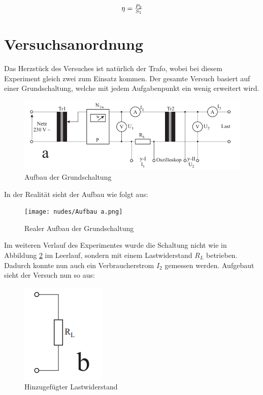 \documentclass[12pt,a4paper,twoside]{article}
\begin{document}
\begin{equation}
    \label{eq:Wirkungsgrad}
    \centerline{$\eta = \frac{P_{2}}{S_{1}}$}
\end{equation}


\section{Versuchsanordnung} %

Das Herzstück des Versuches ist natürlich der Trafo, wobei bei diesem Experiment gleich zwei zum Einsatz kommen. Der gesamte Versuch basiert auf einer Grundschaltung, welche mit jedem Aufgabenpunkt ein wenig erweitert wird.

    \begin{figure}[H]
        \centering
        \includegraphics[width=0.6\linewidth, angle=0]{nudes/Versuchsaufbau a.png}
        \caption{Aufbau der Grundschaltung}
        \label{fig:AufbauDerGrundschaltung}
    \end{figure}

\noindent
In der Realität sieht der Aufbau wie folgt aus:

\begin{figure}[H]
    \centering
    \texttt{[image: nudes/Aufbau a.png]}
    \caption{Realer Aufbau der Grundschaltung}
    \label{fig:RealerAufbauDerGrundschaltung}
\end{figure}

\noindent
Im weiteren Verlauf des Experimentes wurde die Schaltung nicht wie in Abbildung \ref{fig:RealerAufbauDerGrundschaltung} im Leerlauf, sondern mit einem Lastwiderstand $R_{L}$ betrieben. Dadurch konnte nun auch ein Verbraucherstrom $I_{2}$ gemessen werden. Aufgebaut sieht der Versuch nun so aus:

\begin{figure}[H]
    \centering
    \includegraphics[width=0.2\linewidth, angle=0]{nudes/Versuchsaufbau b.png}
    \caption{Hinzugefügter Lastwiderstand}
    \label{fig:AufbauB}
\end{figure}
\end{document}
